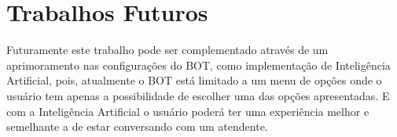  \section{Trabalhos Futuros}
  
Futuramente este trabalho pode ser complementado através de um aprimoramento nas configurações do BOT, como implementação de Inteligência Artificial, pois, atualmente o BOT está limitado a um menu de opções onde o usuário tem apenas a possibilidade de escolher uma das opções apresentadas. E com a Inteligência Artificial o usuário poderá ter uma experiência melhor e semelhante a de estar conversando com um atendente. 












